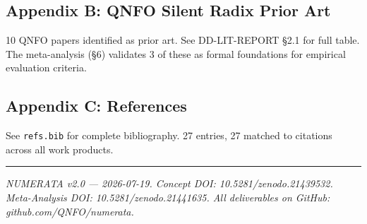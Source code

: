\documentclass[
]{article}
\begin{document}
\subsection{Appendix B: QNFO Silent Radix Prior
Art}\label{appendix-b-qnfo-silent-radix-prior-art}

10 QNFO papers identified as prior art. See DD-LIT-REPORT §2.1 for full
table. The meta-analysis (§6) validates 3 of these as formal foundations
for empirical evaluation criteria.

\subsection{Appendix C: References}\label{appendix-c-references}

See \texttt{refs.bib} for complete bibliography. 27 entries, 27 matched
to citations across all work products.

\begin{center}\rule{0.5\linewidth}{0.5pt}\end{center}

\emph{NUMERATA v2.0 --- 2026-07-19. Concept DOI:
10.5281/zenodo.21439532. Meta-Analysis DOI: 10.5281/zenodo.21441635. All
deliverables on GitHub: github.com/QNFO/numerata.}
\end{document}
